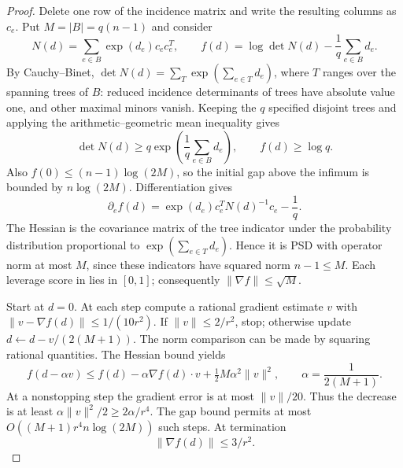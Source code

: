 \begin{proof}
Delete one row of the incidence matrix and write the resulting columns
as $c_e$. Put $M=|B|=q(n-1)$ and consider
\begin{equation}
 N(d)=\sum_{e\in B}\exp(d_e)c_ec_e^T,\qquad
 f(d)=\log\det N(d)-\frac1q\sum_{e\in B}d_e.
 \label{eq:ta-logdet}
\end{equation}
By Cauchy--Binet,
$\det N(d)=\sum_T\exp(\sum_{e\in T}d_e)$, where $T$ ranges over the
spanning trees of $B$: reduced incidence determinants of trees have
absolute value one, and other maximal minors vanish. Keeping the $q$
specified disjoint trees and applying the arithmetic--geometric mean
inequality gives
\[
 \det N(d)\ge q\exp\left(\frac1q\sum_{e\in B}d_e\right),
               \qquad f(d)\ge\log q.
\]
Also $f(0)\le(n-1)\log(2M)$, so the initial gap above the infimum is
bounded by $n\log(2M)$. Differentiation gives
\begin{equation}
 \partial_e f(d)=\exp(d_e)c_e^TN(d)^{-1}c_e-\frac1q.
 \label{eq:ta-gradient}
\end{equation}
The Hessian is the covariance matrix of the tree indicator under the
probability distribution proportional to
$\exp(\sum_{e\in T}d_e)$. Hence it is PSD with operator norm at most
$M$, since these indicators have squared norm $n-1\le M$.
Each leverage score in  lies in $[0,1]$; consequently
$\|\nabla f\|\le\sqrt M$.

Start at $d=0$. At each step compute a rational gradient estimate $v$
with $\|v-\nabla f(d)\|\le1/(10r^2)$. If $\|v\|\le2/r^2$, stop;
otherwise update
$d\leftarrow d-v/(2(M+1))$. The norm comparison can be made by squaring
rational quantities. The Hessian bound yields
\[
 f(d-\alpha v)\le f(d)-\alpha\nabla f(d)\cdot v
                         +\tfrac12M\alpha^2\|v\|^2,
                       \qquad \alpha=\frac1{2(M+1)}.
\]
At a nonstopping step the gradient error is at most $\|v\|/20$.
Thus the decrease is at least
$\alpha\|v\|^2/2\ge2\alpha/r^4$.
The gap bound permits at most
$O((M+1)r^4 n\log(2M))$ such steps. At termination
\begin{equation}
                       \|\nabla f(d)\|\le3/r^2.
 \label{eq:ta-gradient-stop}
\end{equation}


\end{proof}
